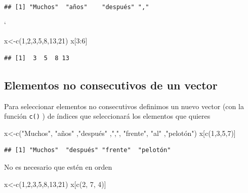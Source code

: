 \documentclass[
]{book}
\newenvironment{Shaded}{\begin{snugshade}}{\end{snugshade}}
\newcommand{\DecValTok}[1]{\textcolor[rgb]{0.00,0.00,0.81}{#1}}
\newcommand{\FunctionTok}[1]{\textcolor[rgb]{0.00,0.00,0.00}{#1}}
\newcommand{\NormalTok}[1]{#1}
\newcommand{\OtherTok}[1]{\textcolor[rgb]{0.56,0.35,0.01}{#1}}
\newcommand{\SpecialCharTok}[1]{\textcolor[rgb]{0.00,0.00,0.00}{#1}}
\newcommand{\StringTok}[1]{\textcolor[rgb]{0.31,0.60,0.02}{#1}}
\begin{document}
\begin{verbatim}
## [1] "Muchos"  "años"    "después" ","
\end{verbatim}

`

\begin{Shaded}
\begin{Highlighting}[]
\NormalTok{x}\OtherTok{\textless{}{-}}\FunctionTok{c}\NormalTok{(}\DecValTok{1}\NormalTok{,}\DecValTok{2}\NormalTok{,}\DecValTok{3}\NormalTok{,}\DecValTok{5}\NormalTok{,}\DecValTok{8}\NormalTok{,}\DecValTok{13}\NormalTok{,}\DecValTok{21}\NormalTok{)}
\NormalTok{x[}\DecValTok{3}\SpecialCharTok{:}\DecValTok{6}\NormalTok{]}
\end{Highlighting}
\end{Shaded}

\begin{verbatim}
## [1]  3  5  8 13
\end{verbatim}

\hypertarget{elementos-no-consecutivos-de-un-vector}{%
\subsection{Elementos no consecutivos de un vector}\label{elementos-no-consecutivos-de-un-vector}}

Para seleccionar elementos no consecutivos definimos un nuevo vector (con la función \texttt{c()} ) de índices que seleccionará los elementos que quieres

\begin{Shaded}
\begin{Highlighting}[]
\NormalTok{x}\OtherTok{\textless{}{-}}\FunctionTok{c}\NormalTok{(}\StringTok{"Muchos"}\NormalTok{, }\StringTok{"años"}\NormalTok{ ,}\StringTok{"después"}\NormalTok{ ,}\StringTok{","}\NormalTok{, }\StringTok{"frente"}\NormalTok{, }\StringTok{"al"}\NormalTok{ ,}\StringTok{"pelotón"}\NormalTok{)}
\NormalTok{x[}\FunctionTok{c}\NormalTok{(}\DecValTok{1}\NormalTok{,}\DecValTok{3}\NormalTok{,}\DecValTok{5}\NormalTok{,}\DecValTok{7}\NormalTok{)]}
\end{Highlighting}
\end{Shaded}

\begin{verbatim}
## [1] "Muchos"  "después" "frente"  "pelotón"
\end{verbatim}

No es necesario que estén en orden

\begin{Shaded}
\begin{Highlighting}[]
\NormalTok{x}\OtherTok{\textless{}{-}}\FunctionTok{c}\NormalTok{(}\DecValTok{1}\NormalTok{,}\DecValTok{2}\NormalTok{,}\DecValTok{3}\NormalTok{,}\DecValTok{5}\NormalTok{,}\DecValTok{8}\NormalTok{,}\DecValTok{13}\NormalTok{,}\DecValTok{21}\NormalTok{)}
\NormalTok{x[}\FunctionTok{c}\NormalTok{(}\DecValTok{2}\NormalTok{, }\DecValTok{7}\NormalTok{, }\DecValTok{4}\NormalTok{)]}
\end{Highlighting}
\end{Shaded}
\end{document}
